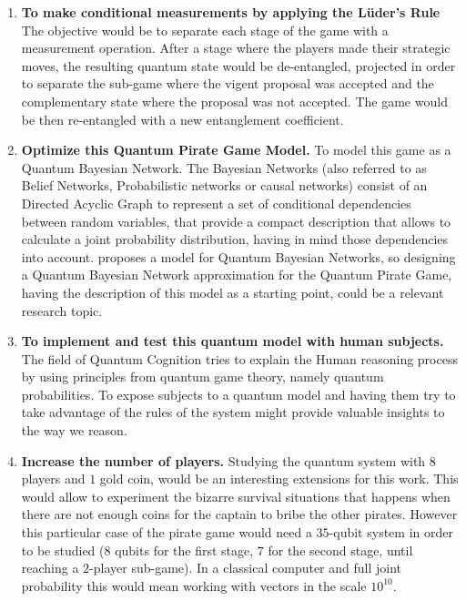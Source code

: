 \documentclass{llncs} %
\begin{document}
\begin{enumerate}

\item \textbf{To make conditional measurements by applying the L\"{u}der's Rule} The objective would be to separate each stage of the game with a measurement operation. After a stage where the players made their strategic moves, the resulting quantum state would be de-entangled, projected in order to separate  the sub-game where the vigent proposal was accepted and the complementary state where the proposal was not accepted. The game would be then re-entangled with a new entanglement coefficient. 

\item \textbf{Optimize this Quantum Pirate Game Model.} To model this game as a Quantum Bayesian Network. The Bayesian Networks (also referred to as Belief Networks, Probabilistic networks or causal networks) consist of an Directed Acyclic Graph to represent a set of conditional dependencies between random variables, that provide a compact description that allows to calculate a joint probability distribution, having in mind those dependencies into account. \cite{Tucci2012} proposes a model for Quantum Bayesian Networks, so designing a Quantum Bayesian Network approximation for the Quantum Pirate Game, having the description of this model as a starting point, could be a relevant research topic.

\item \textbf{To implement and test this quantum model with human subjects.} The field of Quantum Cognition tries to explain the Human reasoning process by using principles from quantum game theory, namely quantum probabilities. To expose subjects to a quantum model and having them try to take advantage of the rules of the system might provide valuable insights to the way we reason. 

\item \textbf{Increase the number of players.} Studying the quantum system with $8$ players and $1$ gold coin, would be an interesting extensions for this work. This would allow to experiment the bizarre survival situations that happens when there are not enough coins for the captain to bribe the other pirates. However this particular case of the pirate game would need a $35$-qubit system in order to be studied ($8$ qubits for the first stage, $7$ for the second stage, until reaching a $2$-player sub-game). In a classical computer and full joint probability this would mean working with vectors in the scale $10^{10}$.


\end{enumerate}
\end{document}
